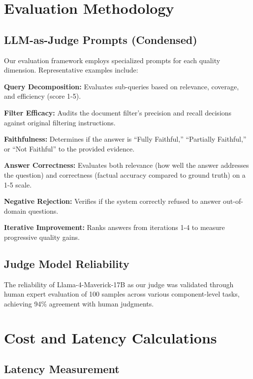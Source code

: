 \documentclass[11pt]{article}
\begin{document}
\section{Evaluation Methodology}
\label{sec:appendix-evaluation}

\subsection{LLM-as-Judge Prompts (Condensed)}

Our evaluation framework employs specialized prompts for each quality dimension. Representative examples include:

\textbf{Query Decomposition:} Evaluates sub-queries based on relevance, coverage, and efficiency (score 1-5).

\textbf{Filter Efficacy:} Audits the document filter's precision and recall decisions against original filtering instructions.

\textbf{Faithfulness:} Determines if the answer is ``Fully Faithful,'' ``Partially Faithful,'' or ``Not Faithful'' to the provided evidence.

\textbf{Answer Correctness:} Evaluates both relevance (how well the answer addresses the question) and correctness (factual accuracy compared to ground truth) on a 1-5 scale.

\textbf{Negative Rejection:} Verifies if the system correctly refused to answer out-of-domain questions.

\textbf{Iterative Improvement:} Ranks answers from iterations 1-4 to measure progressive quality gains.

\subsection{Judge Model Reliability}

The reliability of Llama-4-Maverick-17B as our judge was validated through human expert evaluation of 100 samples across various component-level tasks, achieving 94\% agreement with human judgments.

\section{Cost and Latency Calculations}
\label{sec:appendix-metrics}

\subsection{Latency Measurement}
\end{document}
